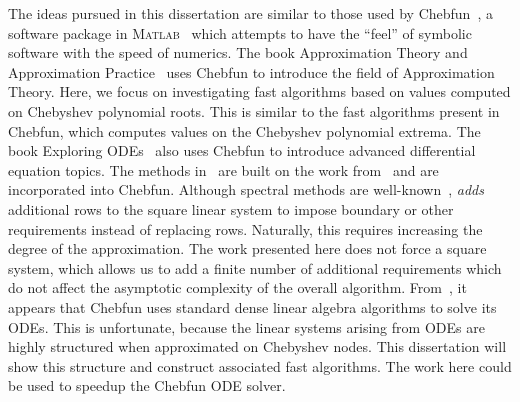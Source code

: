 The ideas pursued in this dissertation are similar to those
used by Chebfun~\cite{driscoll2014chebfun}, a software package
in \textsc{Matlab}~\cite{guide1998mathworks} which attempts
to have the ``feel'' of symbolic software with the speed
of numerics.
The book Approximation Theory and Approximation Practice~\cite{ATAP}
uses Chebfun to introduce the field of  Approximation Theory.
Here, we focus on investigating fast algorithms based
on values computed on Chebyshev polynomial roots.
This is similar to the fast algorithms present in Chebfun,
which computes values on the Chebyshev polynomial extrema.
The book Exploring ODEs~\cite{ExpODEs} also uses
Chebfun to introduce advanced differential equation topics.
The methods in~\cite{ExpODEs} are built on the work
from~\cite{driscoll2015rectangular,aurentz2017block,xu2015explicit}
and are incorporated into Chebfun.
Although spectral methods are well-known~\cite{boyd2001chebyshev},
\cite{aurentz2017block} \emph{adds} additional rows
to the square linear system to impose boundary or other requirements
instead of replacing rows.
Naturally, this requires increasing the degree of the approximation.
The work presented here does not force a square system, which allows
us to add a finite number of additional requirements which do not
affect the asymptotic complexity of the overall algorithm.
From~\cite[Appendix A]{ExpODEs}, it appears that Chebfun uses
standard dense linear algebra algorithms to solve its ODEs.
This is unfortunate, because the linear systems arising from ODEs
are highly structured when approximated on Chebyshev nodes.
This dissertation will show this structure and construct associated
fast algorithms.
The work here could be used to speedup the Chebfun ODE solver.

